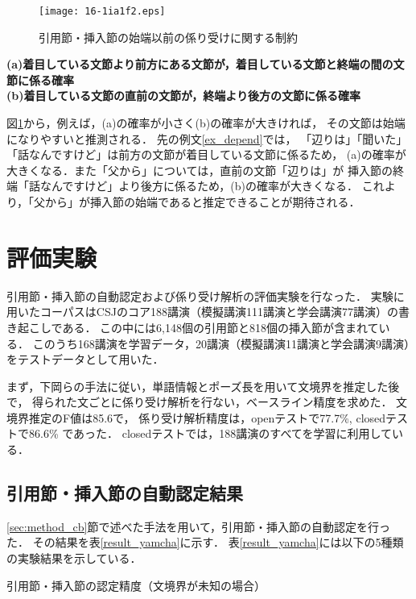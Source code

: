 \documentclass[japanese]{jnlp_1.4}
\begin{document}
\begin{figure}[t]
  \begin{center}
\texttt{[image: 16-1ia1f2.eps]}
  \caption{引用節・挿入節の始端以前の係り受けに関する制約}
  \label{depend}
  \end{center}
\end{figure}

\noindent
{\bf
(a)着目している文節より前方にある文節が，着目している文節と終端の間の文節に係る確率\\
(b)着目している文節の直前の文節が，終端より後方の文節に係る確率\\
}

図\ref{depend}から，例えば，(a)の確率が小さく(b)の確率が大きければ，
その文節は始端になりやすいと推測される．
先の例文\ref{ex_depend}では，
「辺りは」「聞いた」「話なんですけど」は前方の文節が着目している文節に係るため，
(a)の確率が大きくなる．また「父から」については，直前の文節「辺りは」が
挿入節の終端「話なんですけど」より後方に係るため，(b)の確率が大きくなる．
これより，「父から」が挿入節の始端であると推定できることが期待される．


\section{評価実験}\label{sec:eval}

引用節・挿入節の自動認定および係り受け解析の評価実験を行なった．
実験に用いたコーパスはCSJのコア188講演（模擬講演111講演と学会講演77講演）の書き起こしである．
この中には6,148個の引用節と818個の挿入節が含まれている．
このうち168講演を学習データ，20講演（模擬講演11講演と学会講演9講演）をテストデータとして用いた．

まず，下岡らの手法\cite{shitaoka_2005}に従い，単語情報とポーズ長を用いて文境界を推定した後で，
得られた文ごとに係り受け解析を行ない，ベースライン精度を求めた．
文境界推定のF値は85.6で，
係り受け解析精度は，openテストで77.7\%, closedテストで86.6\% であった．
closedテストでは，188講演のすべてを学習に利用している．


\subsection{引用節・挿入節の自動認定結果}\label{sec:eval_cb}

\ref{sec:method_cb}節で述べた手法を用いて，引用節・挿入節の自動認定を行った．
その結果を表\ref{result_yamcha}に示す．
表\ref{result_yamcha}には以下の5種類の実験結果を示している．

\begin{table}[b]
\caption{引用節・挿入節の認定精度（文境界が未知の場合）}
\label{result_yamcha}
\begin{center}

\end{center}
\end{table}
\end{document}
